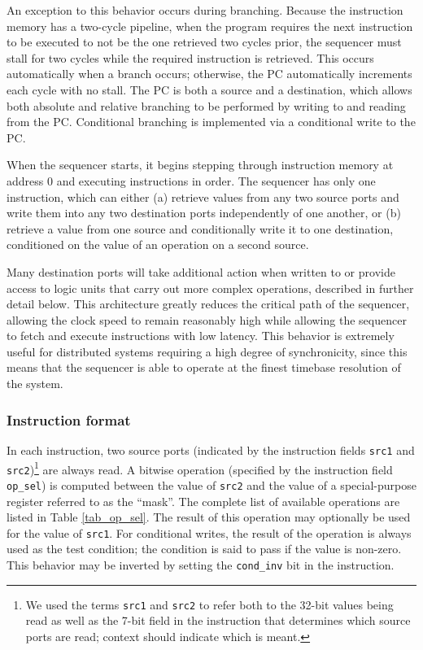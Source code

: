 An exception to this behavior occurs during branching. Because the instruction memory has a two-cycle pipeline, when the program requires the next instruction to be executed to not be the one retrieved two cycles prior, the sequencer must stall for two cycles while the required instruction is retrieved. This occurs automatically when a branch occurs; otherwise, the PC automatically increments each cycle with no stall. The PC is both a source and a destination, which allows both absolute and relative branching to be performed by writing to and reading from the PC. Conditional branching is implemented via a conditional write to the PC.

When the sequencer starts, it begins stepping through instruction memory at address 0 and executing instructions in order. The sequencer has only one instruction, which can either (a) retrieve values from any two source ports and write them into any two destination ports independently of one another, or (b) retrieve a value from one source and conditionally write it to one destination, conditioned on the value of an operation on a second source.

Many destination ports will take additional action when written to or provide access to logic units that carry out more complex operations, described in further detail below. This architecture greatly reduces the critical path of the sequencer, allowing the clock speed to remain reasonably high while allowing the sequencer to fetch and execute instructions with low latency. This behavior is extremely useful for distributed systems requiring a high degree of synchronicity, since this means that the sequencer is able to operate at the finest timebase resolution of the system. 

\subsubsection{Instruction format}

In each instruction, two source ports (indicated by the instruction fields \lstinline|src1| and \lstinline|src2|)\footnote{We used the terms \lstinline|src1| and \lstinline|src2| to refer both to the 32-bit values being read as well as the 7-bit field in the instruction that determines which source ports are read; context should indicate which is meant.} are always read. A bitwise operation (specified by the instruction field \lstinline|op_sel|) is computed between the value of \lstinline|src2| and the value of a special-purpose register referred to as the ``mask''. The complete list of available operations are listed in Table \ref{tab_op_sel}. The result of this operation may optionally be used for the value of \lstinline|src1|. For conditional writes, the result of the operation is always used as the test condition; the condition is said to pass if the value is non-zero. This behavior may be inverted by setting the \lstinline|cond_inv| bit in the instruction. 

